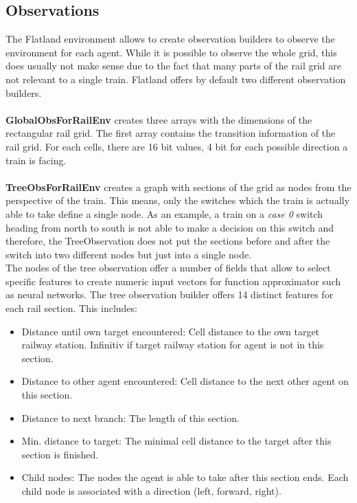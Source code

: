 \subsection*{Observations}\label{observations}
The Flatland environment allows to create observation builders to observe the environment for each agent. While it is possible to observe the whole grid, this does usually not make sense due to the fact that many parts of the rail grid are not relevant to a single train. Flatland offers by default two different observation builders.\\\\
\textbf{GlobalObsForRailEnv} creates three arrays with the dimensions of the rectangular rail grid. The first array contains the transition information of the rail grid. For each cells, there are 16 bit values, 4 bit for each possible direction a train is facing.\\\\
\textbf{TreeObsForRailEnv} creates a graph with sections of the grid as nodes from the perspective of the train.
This means, only the switches which the train is actually able to take define a single node. As an example, a train on a \textit{case 0} switch heading from north to south is not able to make a decision on this switch and therefore, the TreeObservation does not put the sections before and after the switch into two different nodes but just into a single node.\\
The nodes of the tree observation offer a number of fields that allow to select specific features to create numeric input vectors for function approximator such as neural networks. The tree observation builder offers 14 distinct features for each rail section. This includes:
\begin{itemize}
	\item Distance until own target encountered: Cell distance to the own target railway station. Infinitiv if target railway station for agent is not in this section.
	\item Distance to other agent encountered: Cell distance to the next other agent on this section.
	\item Distance to next branch: The length of this section.
	\item Min. distance to target: The minimal cell distance to the target after this section is finished.
	\item Child nodes: The nodes the agent is able to take after this section ends. Each child node is associated with a direction (left, forward, right).
\end{itemize}
